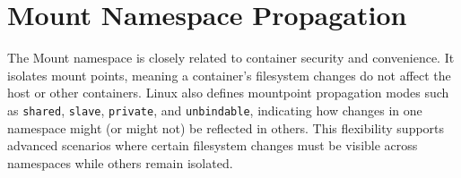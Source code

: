 \section{Mount Namespace Propagation}

The Mount namespace is closely related to container security and convenience. It isolates mount points, meaning a container’s filesystem changes do not affect the host or other containers. Linux also defines mountpoint propagation modes such as \texttt{shared}, \texttt{slave}, \texttt{private}, and \texttt{unbindable}, indicating how changes in one namespace might (or might not) be reflected in others. This flexibility supports advanced scenarios where certain filesystem changes must be visible across namespaces while others remain isolated.